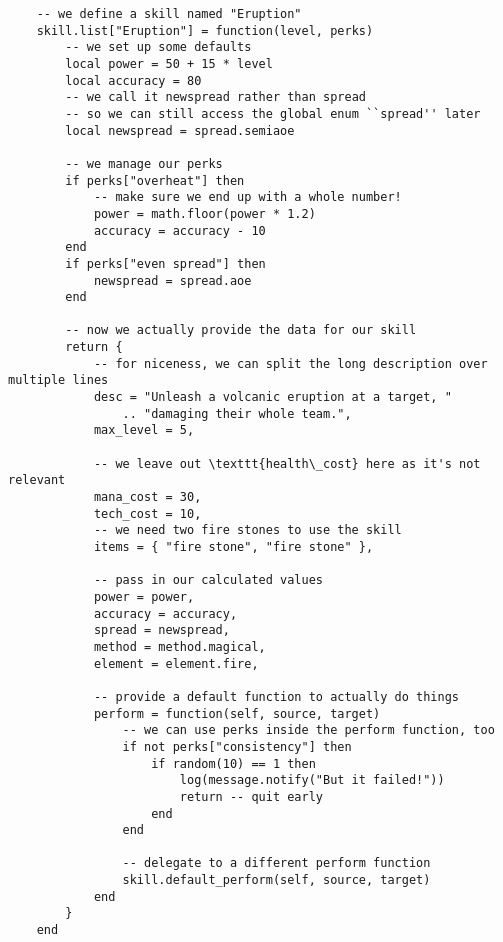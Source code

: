 \begin{lstlisting}
    -- we define a skill named "Eruption"
    skill.list["Eruption"] = function(level, perks)
        -- we set up some defaults
        local power = 50 + 15 * level
        local accuracy = 80
        -- we call it newspread rather than spread
        -- so we can still access the global enum ``spread'' later
        local newspread = spread.semiaoe

        -- we manage our perks
        if perks["overheat"] then
            -- make sure we end up with a whole number!
            power = math.floor(power * 1.2)
            accuracy = accuracy - 10
        end
        if perks["even spread"] then
            newspread = spread.aoe
        end

        -- now we actually provide the data for our skill
        return {
            -- for niceness, we can split the long description over multiple lines
            desc = "Unleash a volcanic eruption at a target, "
                .. "damaging their whole team.",
            max_level = 5,

            -- we leave out \texttt{health\_cost} here as it's not relevant
            mana_cost = 30,
            tech_cost = 10,
            -- we need two fire stones to use the skill
            items = { "fire stone", "fire stone" },

            -- pass in our calculated values
            power = power,
            accuracy = accuracy,
            spread = newspread,
            method = method.magical,
            element = element.fire,

            -- provide a default function to actually do things
            perform = function(self, source, target)
                -- we can use perks inside the perform function, too
                if not perks["consistency"] then
                    if random(10) == 1 then
                        log(message.notify("But it failed!"))
                        return -- quit early
                    end
                end

                -- delegate to a different perform function
                skill.default_perform(self, source, target)
            end
        }
    end
\end{lstlisting}
